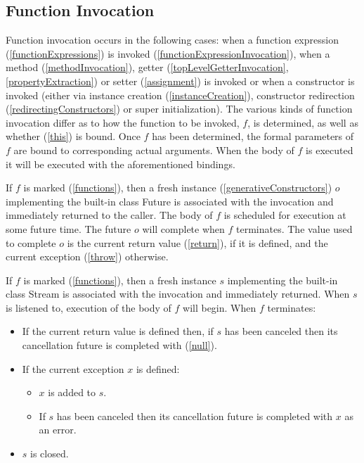\documentclass{article}
\newcommand{\code}[1]{{\sf #1}}
\begin{document}



\subsection{ Function Invocation}

\LMHash{}
Function invocation occurs in the following cases: when a function expression  (\ref{functionExpressions}) is invoked (\ref{functionExpressionInvocation}), when a method (\ref{methodInvocation}), getter (\ref{topLevelGetterInvocation}, \ref{propertyExtraction}) or setter (\ref{assignment}) is invoked or when a constructor is invoked (either via instance creation (\ref{instanceCreation}), constructor redirection (\ref{redirectingConstructors}) or super initialization). The various kinds of function invocation differ as to how the function to be invoked, $f$,  is determined, as well as whether \THIS{} (\ref{this}) is bound. Once $f$ has been determined, the formal parameters of $f$ are bound to corresponding actual arguments. When the body of $f$ is executed it will be executed with the aforementioned bindings.

\LMHash{}
If $f$ is marked \ASYNC{} (\ref{functions}), then a fresh instance (\ref{generativeConstructors}) $o$ implementing the built-in class \code{Future} is associated with the invocation and immediately returned to the caller. The body of $f$ is scheduled for execution at some future time. The future $o$ will complete when $f$ terminates. The value used to complete $o$ is the current return value (\ref{return}), if it is defined, and the current exception (\ref{throw}) otherwise.

\LMHash{}
If $f$ is marked \ASYNC* (\ref{functions}), then a fresh instance $s$ implementing the built-in class \code{Stream} is associated with the invocation and immediately returned. When $s$ is listened to, execution of the body of $f$ will begin.  When $f$ terminates:
\begin{itemize}
\item If the current return value is defined then, if $s$ has been canceled then its cancellation future is completed with \NULL{} (\ref{null}).
\item If the current exception $x$ is defined:
  \begin{itemize}
  \item $x$ is added to $s$.
  \item If $s$ has been canceled then its cancellation future is completed with $x$ as an error.
  \end{itemize}
\item $s$ is closed.
\end{itemize}
\end{document}
